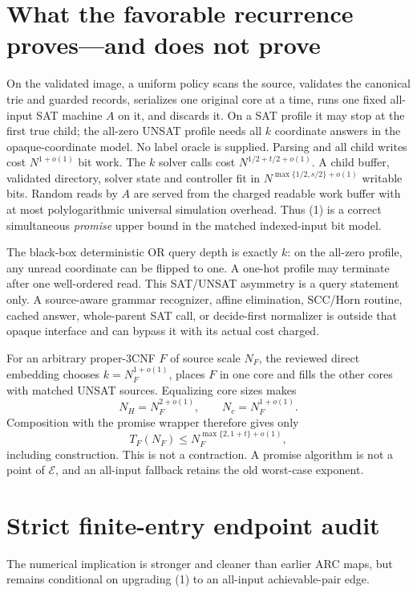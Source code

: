 \documentclass[11pt]{article}
\begin{document}
\section{What the favorable recurrence proves---and does not prove}
On the validated image, a uniform policy scans the source, validates the
canonical trie and guarded records, serializes one original core at a time,
runs one fixed all-input SAT machine $A$ on it, and discards it.  On a SAT
profile it may stop at the first true child; the all-zero UNSAT profile needs
all $k$ coordinate answers in the opaque-coordinate model.  No label oracle
is supplied.  Parsing and all child writes cost $N^{1+o(1)}$ bit work.
The $k$ solver calls cost
$N^{1/2+t/2+o(1)}$.  A child buffer, validated directory, solver state and
controller fit in
$N^{\max\{1/2,s/2\}+o(1)}$ writable bits.  Random reads by $A$ are served
from the charged readable work buffer with at most polylogarithmic universal
simulation overhead.  Thus (1) is a correct simultaneous \emph{promise}
upper bound in the matched indexed-input bit model.

The black-box deterministic OR query depth is exactly $k$: on the all-zero
profile, any unread coordinate can be flipped to one.  A one-hot profile may
terminate after one well-ordered read.  This SAT/UNSAT asymmetry is a query
statement only.  A source-aware grammar recognizer, affine elimination,
SCC/Horn routine, cached answer, whole-parent SAT call, or decide-first
normalizer is outside that opaque interface and can bypass it with its actual
cost charged.

For an arbitrary proper-3CNF $F$ of source scale $N_F$, the reviewed direct
embedding chooses $k=N_F^{1+o(1)}$, places $F$ in one core and fills the other
cores with matched UNSAT sources.  Equalizing core sizes makes
\[
 N_H=N_F^{2+o(1)},\qquad N_c=N_F^{1+o(1)}.
\]
Composition with the promise wrapper therefore gives only
\[
 T_F(N_F)\le N_F^{\max\{2,1+t\}+o(1)},                              \tag{6}
\]
including construction.  This is not a contraction.  A promise algorithm is
not a point of $\mathcal E$, and an all-input fallback retains the old
worst-case exponent.

\section{Strict finite-entry endpoint audit}
The numerical implication is stronger and cleaner than earlier ARC maps, but
remains conditional on upgrading (1) to an all-input achievable-pair edge.
\end{document}
